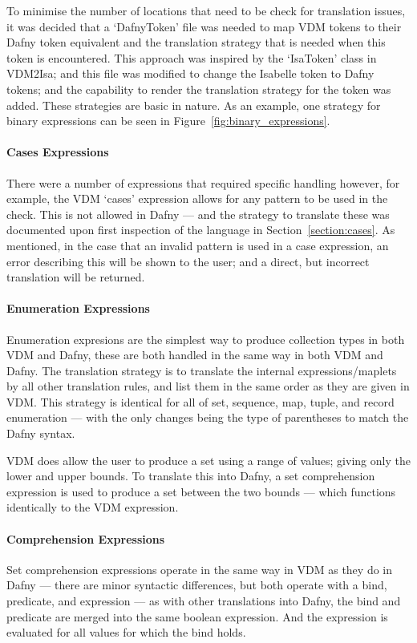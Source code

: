 \documentclass{entcs}
\begin{document}
To minimise the number of locations that need to be check for translation issues, it was decided that a `DafnyToken' file was needed to map VDM tokens to their Dafny token equivalent and the translation strategy that is needed when this token is encountered. This approach was inspired by the `IsaToken' class in VDM2Isa; and this file was modified to change the Isabelle token to Dafny tokens; and the capability to render the translation strategy for the token was added. These strategies are basic in nature. As an example, one strategy for binary expressions can be seen in Figure~\ref{fig:binary_expressions}. 

\paragraph{Cases Expressions}

There were a number of expressions that required specific handling however, for example, the VDM `cases' expression allows for any pattern to be used in the check. This is not allowed in Dafny --- and the strategy to translate these was documented upon first inspection of the language in Section~\ref{section:cases}. As mentioned, in the case that an invalid pattern is used in a case expression, an error describing this will be shown to the user; and a direct, but incorrect translation will be returned.

\paragraph{Enumeration Expressions}

Enumeration expresions are the simplest way to produce collection types in both VDM and Dafny, these are both handled in the same way in both VDM and Dafny. The translation strategy is to translate the internal expressions/maplets by all other translation rules, and list them in the same order as they are given in VDM. This strategy is identical for all of set, sequence, map, tuple, and record enumeration --- with the only changes being the type of parentheses to match the Dafny syntax.

VDM does allow the user to produce a set using a range of values; giving only the lower and upper bounds. To translate this into Dafny, a set comprehension expression is used to produce a set between the two bounds --- which functions identically to the VDM expression.

\paragraph{Comprehension Expressions}
Set comprehension expressions operate in the same way in VDM as they do in Dafny --- there are minor syntactic differences, but both operate with a bind, predicate, and expression --- as with other translations into Dafny, the bind and predicate are merged into the same boolean expression. And the expression is evaluated for all values for which the bind holds. 
\end{document}
